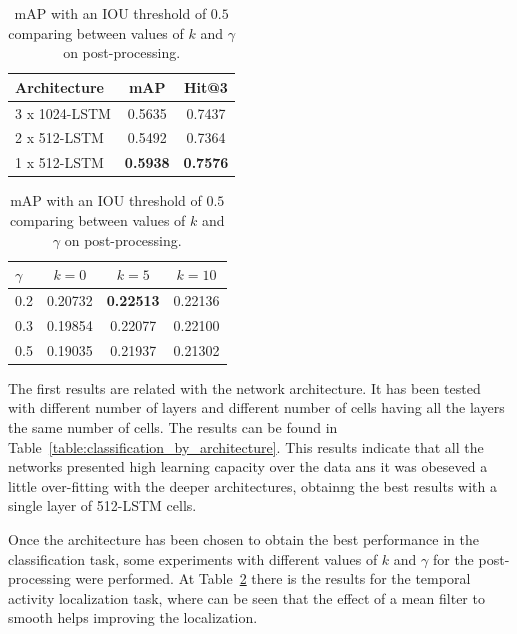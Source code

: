 \documentclass{article}
\begin{document}
\begin{table}[h]
    \parbox{.45\linewidth}{
        \centering
        \begin{tabular}{l|cc}
        \textbf{Architecture} & \textbf{mAP} & \textbf{Hit@3} \\
        \hline
        3 x 1024-LSTM & 0.5635 & 0.7437 \\
        2 x 512-LSTM & 0.5492 & 0.7364 \\
        1 x 512-LSTM & \bf0.5938 & \bf0.7576 \\
        \end{tabular}
        \vspace{.5cm}
        \caption{Results for classification task comparing different architectures.}
        \label{table:classification_by_architecture}
    }
    \hfill
    \parbox{.45\linewidth}{
        \centering
        \begin{tabular}{l|ccc}
        \textbf{$\gamma$} & \textbf{$k=0$} & \textbf{$k=5$} & \textbf{$k=10$} \\
        \hline
        0.2 & 0.20732 & \bf0.22513 & 0.22136 \\
        0.3 & 0.19854 & 0.22077 & 0.22100 \\
        0.5 & 0.19035 & 0.21937 & 0.21302 \\
        \end{tabular}
        \vspace{.2cm}
        \caption{mAP with an IOU threshold of $0.5$ comparing between values of $k$ and $\gamma$ on post-processing.}
        \label{table:detection_postprocessing_comparison}
    }
\end{table}

The first results are related with the network architecture. It has been tested with different number of layers and different number of cells having all the layers the same number of cells. The results can be found in Table~\ref{table:classification_by_architecture}.
This results indicate that all the networks presented high learning capacity over the data ans it was obeseved a little over-fitting with the deeper architectures, obtainng the best results with a single layer of 512-LSTM cells.

Once the architecture has been chosen to obtain the best performance in the classification task, some experiments with different values of $k$ and $\gamma$ for the post-processing were performed.
At Table~\ref{table:detection_postprocessing_comparison} there is the results for the temporal activity localization task, where can be seen that the effect of a mean filter to smooth helps improving the localization.
\end{document}
